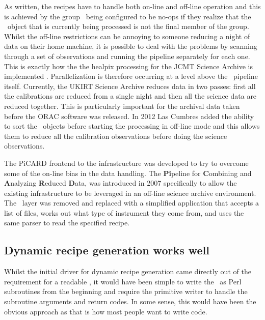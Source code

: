 \documentclass[final,authoryear,5p,times,twocolumn]{elsarticle}
\begin{document}
As written, the recipes have to handle both on-line and off-line
operation and this is achieved by the group \primitives\ being
configured to be no-ops if they realize that the \Frame\ object that
is currently being processed is not the final member of the group.
Whilst the off-line restrictions can be annoying to someone reducing a
night of data on their home machine, it is possible to deal with the
problems by scanning through a set of observations and running the
pipeline separately for each one. This is exactly how the the healpix
processing for the JCMT Science Archive is implemented
\citep{2014SPIE9152-93}. Parallelization is therefore occurring at a
level above the \oracdr\ pipeline itself. Currently, the UKIRT Science
Archive \citep{2014ASPC..485..143B} reduces data in two passes: first
all the calibrations are reduced from a single night and then all the
science data are reduced together. This is particularly important for
the archival data taken before the ORAC software was released.
In 2012 Las Cumbres added the ability to sort the \Group\ objects
before starting the processing in off-line mode and this allows them to
reduce all the calibration observations before doing the science
observations.

The PiCARD \citep{SUN265} frontend to the infrastructure was developed
to try to overcome some of the on-line bias in the data handling. The
\textbf{Pi}peline for \textbf{C}ombining and \textbf{A}nalyzing
\textbf{R}educed \textbf{D}ata, was introduced in 2007
\citep{2008ASPC..394..565J} specifically to allow the existing
infrastructure to be leveraged in an off-line science archive
environment. The \oracdr\ layer was removed and replaced with a
simplified application that accepts a list of files, works out what
type of instrument they come from, and uses the same parser to read
the specified recipe.

\subsection{Dynamic recipe generation works well}

Whilst the initial driver for dynamic recipe generation came directly
out of the requirement for a readable \recipe, it would have been
simple to write the \primitives\ as Perl subroutines from the
beginning and require the primitive writer to handle the subroutine
arguments and return codes. In some sense, this would have been the
obvious approach as that is how most people want to write code.
\end{document}
